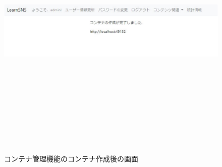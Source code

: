 \begin{figure}[htbp]
    \begin{center}
        \includegraphics[width=13cm,height=12cm,keepaspectratio]{container_after-crop.pdf}\\
    \end{center}
    \caption{コンテナ管理機能のコンテナ作成後の画面}
    \label{container_ex_after}
\end{figure}

